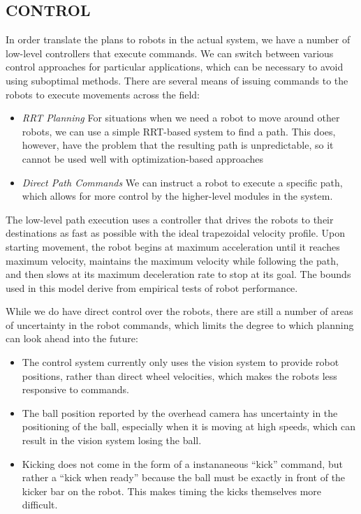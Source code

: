 \documentclass[a4paper, 10pt, conference]{ieeeconf}      %
\begin{document}
\subsection{CONTROL}
In order translate the plans to robots in the actual system, we have a number of low-level controllers that execute commands. We can switch between various control approaches for particular applications, which can be necessary to avoid using suboptimal methods.  There are several means of issuing commands to the robots to execute movements across the field:
\begin{itemize}
 \item \textit{RRT Planning} For situations when we need a robot to move around other robots, we can use a simple RRT-based system to find a path.  This does, however, have the problem that the resulting path is unpredictable, so it cannot be used well with optimization-based approaches
 \item \textit{Direct Path Commands} We can instruct a robot to execute a specific path, which allows for more control by the higher-level modules in the system.  
 \end{itemize}

The low-level path execution uses a controller that drives the robots to their destinations as fast as possible with the ideal trapezoidal velocity profile.  Upon starting movement, the robot begins at maximum acceleration until it reaches maximum velocity, maintains the maximum velocity while following the path, and then slows at its maximum deceleration rate to stop at its goal.  The bounds used in this model derive from empirical tests of robot performance.  

While we do have direct control over the robots, there are still a number of areas of uncertainty in the robot commands, which limits the degree to which planning can look ahead into the future:
\begin{itemize}
 \item The control system currently only uses the vision system to provide robot positions, rather than direct wheel velocities, which makes the robots less responsive to commands.
 \item The ball position reported by the overhead camera has uncertainty in the positioning of the ball, especially when it is moving at high speeds, which can result in the vision system losing the ball.
 \item Kicking does not come in the form of a instananeous ``kick'' command, but rather a ``kick when ready'' because the ball must be exactly in front of the kicker bar on the robot.  This makes timing the kicks themselves more difficult.  
\end{itemize}
\end{document}
